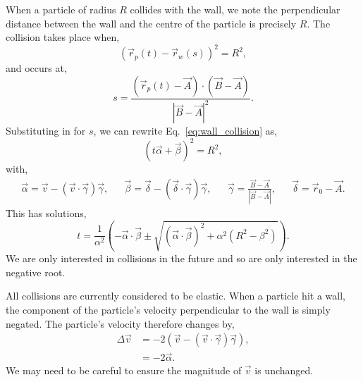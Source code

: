 \documentclass{article}
\begin{document}
When a particle of radius $R$ collides with the wall, we note the perpendicular distance between the wall and the centre of the particle is precisely $R$. The collision takes place when,
\begin{equation}
\label{eq:wall_collision}
    (\vec{r}_p(t) - \vec{r}_w(s))^2 = R^2,
\end{equation}
and occurs at,
\begin{equation}
    s
    =
    \frac{(\vec{r}_p(t) - \vec{A}) \cdot (\vec{B} - \vec{A})}{|\vec{B} - \vec{A}|^2}.
\end{equation}
Substituting in for $s$, we can rewrite Eq.~\ref{eq:wall_collision} as,
\begin{equation}
    (t\vec{\alpha} + \vec{\beta})^2 = R^2,
\end{equation}
with,
\begin{align}
    \vec{\alpha}
    =
    \vec{v} - (\vec{v} \cdot \vec{\gamma}) \vec{\gamma},
    &&
    \vec{\beta}
    =
    \vec{\delta} - (\vec{\delta} \cdot \vec{\gamma}) \vec{\gamma},
    &&
    \vec{\gamma} = \frac{\vec{B} - \vec{A}}{|\vec{B}-\vec{A}|},
    &&
    \vec{\delta} = \vec{r}_0 - \vec{A}.
\end{align}
This has solutions,
\begin{equation}
\label{eq:wall_collision_sol}
    t
    =
    \frac{1}{\alpha^2}
    \left(
        -\vec{\alpha} \cdot \vec{\beta}
        \pm
        \sqrt{(\vec{\alpha} \cdot \vec{\beta})^2 + \alpha^2(R^2 - \beta^2)}
    \right).
\end{equation}
We are only interested in collisions in the future and so are only interested in the negative root.

All collisions are currently considered to be elastic. When a particle hit a wall, the component of the particle's velocity perpendicular to the wall is simply negated. The particle's velocity therefore changes by,
\begin{align}
    \Delta \vec{v}
    &=
    -2(\vec{v} - (\vec{v} \cdot \vec{\gamma}) \vec{\gamma}), \\
    &=
    -2 \vec{\alpha}.
\end{align}
We may need to be careful to ensure the magnitude of $\vec{v}$ is unchanged.
\end{document}
